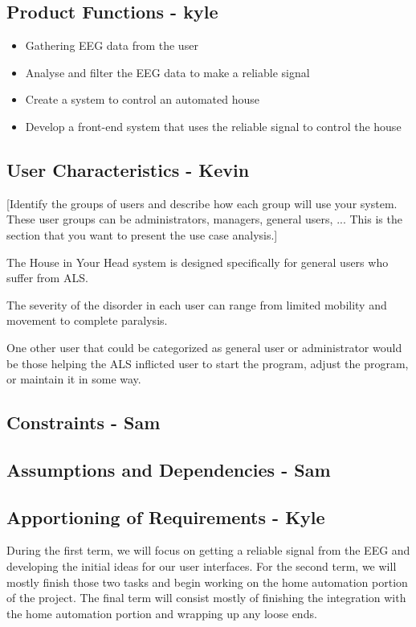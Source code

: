\documentclass{article}
\begin{document}
\subsection{Product Functions - kyle}
\begin{itemize}
\item Gathering EEG data from the user
\item Analyse and filter the EEG data to make a reliable signal
\item Create a system to control an automated house
\item Develop a front-end system that uses the reliable signal to control the house

\end{itemize}

\subsection{User Characteristics - Kevin}

[Identify the groups of users and describe how each group will use your system. These user groups
can be administrators, managers, general users, ... This is the section that you want to present the use 
case analysis.]

The House in Your Head system is designed specifically for general users who suffer from ALS. 

The severity of the disorder in each user can range from limited mobility and movement to complete 
paralysis. 

One other user that could be categorized as general user or administrator would be those helping the 
ALS inflicted user to start the program, adjust the program, or maintain it in some way.

\subsection{Constraints - Sam}

\subsection{Assumptions and Dependencies - Sam}

\subsection{Apportioning of Requirements - Kyle}
During the first term, we will focus on getting a reliable signal from the EEG and developing the initial ideas for our user interfaces. For the second term, we will mostly finish those two tasks and begin working on the home automation portion of the project. The final term will consist mostly of finishing the integration with the home automation portion and wrapping up any loose ends.
\newpage
\end{document}
